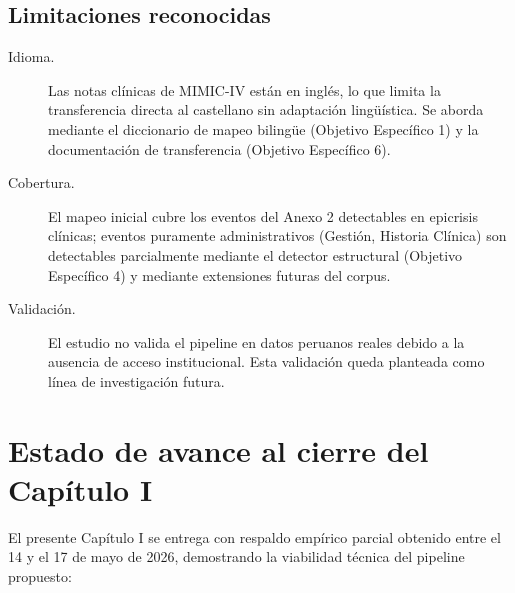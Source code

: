 \subsection*{Limitaciones reconocidas}
\begin{description}
    \item[Idioma.] Las notas clínicas de MIMIC-IV están en inglés, lo que limita la transferencia directa al castellano sin adaptación lingüística. Se aborda mediante el diccionario de mapeo bilingüe (Objetivo Específico 1) y la documentación de transferencia (Objetivo Específico 6).
    \item[Cobertura.] El mapeo inicial cubre los eventos del Anexo 2 detectables en epicrisis clínicas; eventos puramente administrativos (Gestión, Historia Clínica) son detectables parcialmente mediante el detector estructural (Objetivo Específico 4) y mediante extensiones futuras del corpus.
    \item[Validación.] El estudio no valida el pipeline en datos peruanos reales debido a la ausencia de acceso institucional. Esta validación queda planteada como línea de investigación futura.
\end{description}

\section{Estado de avance al cierre del Capítulo I}

El presente Capítulo I se entrega con respaldo empírico parcial obtenido entre el 14 y el 17 de mayo de 2026, demostrando la viabilidad técnica del pipeline propuesto:


